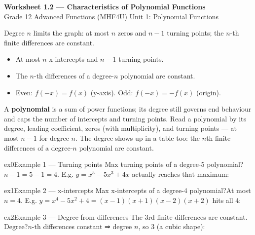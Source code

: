 \documentclass[11pt]{article}
\begin{document}
\begin{center}
{\LARGE\bfseries\color{titleblue}Worksheet 1.2 --- Characteristics of Polynomial Functions}\\[2pt]
{\small Grade 12 Advanced Functions (MHF4U) \textperiodcentered{} Unit 1: Polynomial Functions}
\end{center}

\begin{ideabox}
Degree $n$ limits the graph: at most $n$ zeros and $n-1$ turning points; the $n$-th finite differences are constant.
\begin{itemize}[leftmargin=*,itemsep=2pt]
  \item At most $n$ x-intercepts and $n-1$ turning points.
  \item The $n$-th differences of a degree-$n$ polynomial are constant.
  \item Even: $f(-x)=f(x)$ (y-axis). Odd: $f(-x)=-f(x)$ (origin).
\end{itemize}
\end{ideabox}

\begin{learnbox}
A \textbf{polynomial} is a sum of power functions; its degree still governs end behaviour and caps the number of intercepts and turning points.
Read a polynomial by its degree, leading coefficient, zeros (with multiplicity), and turning points — at most $n-1$ for degree $n$.
The degree shows up in a table too: the $n$th finite differences of a degree-$n$ polynomial are constant.
\end{learnbox}


\begin{example}{ex0}{Example 1 --- Turning points}
Max turning points of a degree-5 polynomial?\soln $n-1=5-1=4$. E.g. $y=x^5-5x^3+4x$ actually reaches that maximum:
\end{example}

\begin{example}{ex1}{Example 2 --- x-intercepts}
Max x-intercepts of a degree-4 polynomial?\soln At most $n=4$. E.g. $y=x^4-5x^2+4=(x-1)(x+1)(x-2)(x+2)$ hits all $4$:
\end{example}

\begin{example}{ex2}{Example 3 --- Degree from differences}
The 3rd finite differences are constant. Degree?\soln $n$-th differences constant ⇒ degree $n$, so $3$ (a cubic shape):
\end{example}
\end{document}
